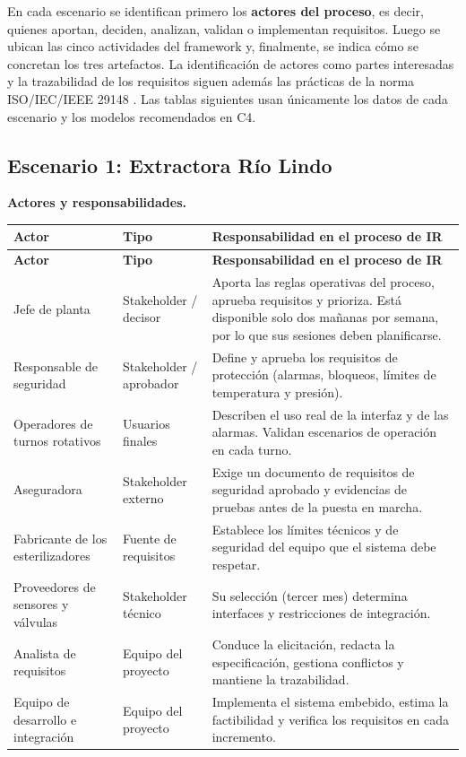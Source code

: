 \documentclass[12pt,a4paper]{article}
\begin{document}
En cada escenario se identifican primero los \textbf{actores del proceso}, es decir, quienes aportan, deciden, analizan, validan o implementan requisitos. Luego se ubican las cinco actividades del framework y, finalmente, se indica cómo se concretan los tres artefactos. La identificación de actores como partes interesadas y la trazabilidad de los requisitos siguen además las prácticas de la norma ISO/IEC/IEEE 29148 \cite{ISO29148}. Las tablas siguientes usan únicamente los datos de cada escenario y los modelos recomendados en C4.

\subsection{Escenario 1: Extractora Río Lindo}

\textbf{Actores y responsabilidades.}

{\small
\setlength{\tabcolsep}{4pt}
\renewcommand{\arraystretch}{1.3}
\begin{longtable}{
|>{\raggedright\arraybackslash}p{}
|>{\raggedright\arraybackslash}p{}
|>{\raggedright\arraybackslash}p{}|}
\hline
\textbf{Actor} & \textbf{Tipo} & \textbf{Responsabilidad en el proceso de IR} \\
\hline
\endfirsthead
\hline
\textbf{Actor} & \textbf{Tipo} & \textbf{Responsabilidad en el proceso de IR} \\
\hline
\endhead
Jefe de planta & Stakeholder / decisor & Aporta las reglas operativas del proceso, aprueba requisitos y prioriza. Está disponible solo dos mañanas por semana, por lo que sus sesiones deben planificarse. \\
\hline
Responsable de seguridad & Stakeholder / aprobador & Define y aprueba los requisitos de protección (alarmas, bloqueos, límites de temperatura y presión). \\
\hline
Operadores de turnos rotativos & Usuarios finales & Describen el uso real de la interfaz y de las alarmas. Validan escenarios de operación en cada turno. \\
\hline
Aseguradora & Stakeholder externo & Exige un documento de requisitos de seguridad aprobado y evidencias de pruebas antes de la puesta en marcha. \\
\hline
Fabricante de los esterilizadores & Fuente de requisitos & Establece los límites técnicos y de seguridad del equipo que el sistema debe respetar. \\
\hline
Proveedores de sensores y válvulas & Stakeholder técnico & Su selección (tercer mes) determina interfaces y restricciones de integración. \\
\hline
Analista de requisitos & Equipo del proyecto & Conduce la elicitación, redacta la especificación, gestiona conflictos y mantiene la trazabilidad. \\
\hline
Equipo de desarrollo e integración & Equipo del proyecto & Implementa el sistema embebido, estima la factibilidad y verifica los requisitos en cada incremento. \\
\hline
\end{longtable}
}
\end{document}
